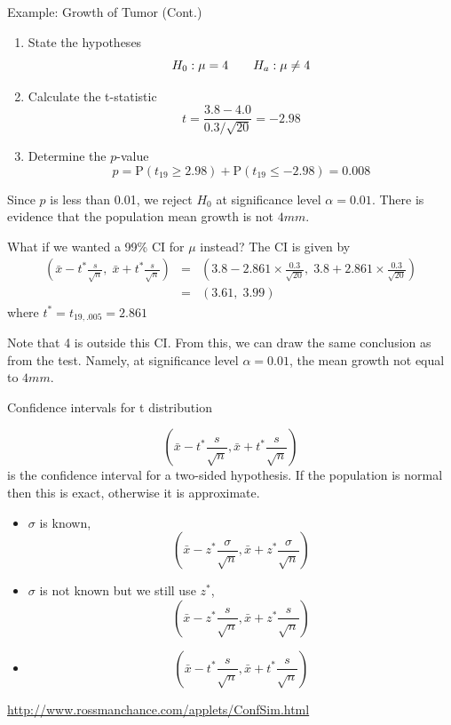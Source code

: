 \documentclass{beamer}\usepackage[]{graphicx}\usepackage[]{color}
\begin{document}
\begin{frame}{Example: Growth of Tumor (Cont.)}

\footnotesize
\begin{enumerate}
    \item State the hypotheses 
      \[H_0: \mu = 4 \mbox \qquad H_a: \mu \ne 4 \] \pause
    \item Calculate the t-statistic
      \[ t = \frac{3.8-4.0}{0.3/\sqrt{20}} = -2.98 \] \pause
    \item Determine the $p$-value
      \[ p = \mbox{P}(t_{19} \ge 2.98) +  \mbox{P}(t_{19} \le -2.98) = 0.008 \] \pause
    \end{enumerate}
    Since $p$ is less than 0.01, we reject $H_0$ at significance level
    $\alpha = 0.01$. There is evidence that the population mean growth
    is not $4mm$. \pause

    What if we wanted a 99\% CI for $\mu$ instead? The CI is given by
    \begin{eqnarray*}
      \left(\bar{x} - t^{*}\frac{s}{\sqrt{n}},\;
        \bar{x} + t^{*}\frac{s}{\sqrt{n}}\right) &=& \left(3.8 - 2.861 \times \frac{0.3}{\sqrt{20}},\;
        3.8 + 2.861 \times \frac{0.3}{\sqrt{20}}\right)\\
      &=& \left(3.61,\; 3.99\right)
    \end{eqnarray*}
    where $t^{*}=t_{19,.005}=2.861$ \pause

    Note that 4 is outside this CI. From this, we can draw the same
    conclusion as from the test. Namely, at significance level
    $\alpha=0.01$, the mean growth not equal to $4mm$.
\normalsize
\end{frame}

\begin{frame}{Confidence intervals for t distribution }

$$(\bar{x}-t^* \frac{s}{\sqrt{n}}, \bar{x}+t^* \frac{s}{\sqrt{n}})$$ is the confidence interval for a two-sided hypothesis. If the population is normal then this is exact, otherwise it is approximate.  \pause

\begin{itemize}
\item $\sigma$ is known, $$(\bar{x}-z^* \frac{\sigma}{\sqrt{n}}, \bar{x}+z^* \frac{\sigma}{\sqrt{n}})$$ \pause
\item $\sigma$ is not known but we still use $z^*$, $$(\bar{x}-z^* \frac{s}{\sqrt{n}}, \bar{x}+z^* \frac{s}{\sqrt{n}})$$ \pause
\item $$(\bar{x}-t^* \frac{s}{\sqrt{n}}, \bar{x}+t^* \frac{s}{\sqrt{n}})$$ \pause
\end{itemize}
\vspace{-0.1 in}
\begin{center}
\url{http://www.rossmanchance.com/applets/ConfSim.html}
\end{center}
\end{frame}
\end{document}
